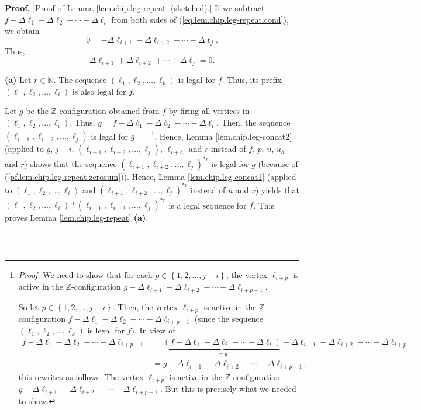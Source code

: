 \documentclass[numbers=enddot,12pt,final,onecolumn,notitlepage]{scrartcl}%
\theoremstyle{definition}
\newenvironment{proof}[1][Proof]{\noindent\textbf{#1.} }{\ \rule{0.5em}{0.5em}}
\begin{document}
\begin{proof}
[Proof of Lemma \ref{lem.chip.leg-repeat} (sketched).] If we subtract
$f-\Delta\ell_{1}-\Delta\ell_{2}-\cdots-\Delta\ell_{i}$ from both sides of
(\ref{eq.lem.chip.leg-repeat.cond}), we obtain%
\[
0=-\Delta\ell_{i+1}-\Delta\ell_{i+2}-\cdots-\Delta\ell_{j}.
\]
Thus,%
\begin{equation}
\Delta\ell_{i+1}+\Delta\ell_{i+2}+\cdots+\Delta\ell_{j}%
=0.\label{pf.lem.chip.leg-repeat.zerosum}%
\end{equation}


\textbf{(a)} Let $r\in\mathbb{N}$. The sequence $\left(  \ell_{1},\ell
_{2},\ldots,\ell_{k}\right)  $ is legal for $f$. Thus, its prefix $\left(
\ell_{1},\ell_{2},\ldots,\ell_{i}\right)  $ is also legal for $f$.

Let $g$ be the $\mathbb{Z}$-configuration obtained from $f$ by firing all
vertices in $\left(  \ell_{1},\ell_{2},\ldots,\ell_{i}\right)  $. Thus,
$g=f-\Delta\ell_{1}-\Delta\ell_{2}-\cdots-\Delta\ell_{i}$. Then, the sequence
$\left(  \ell_{i+1},\ell_{i+2},\ldots,\ell_{j}\right)  $ is legal for
$g$\ \ \ \ \footnote{\textit{Proof.} We need to show that for each
$p\in\left\{  1,2,\ldots,j-i\right\}  $, the vertex $\ell_{i+p}$ is active in
the $\mathbb{Z}$-configuration $g-\Delta\ell_{i+1}-\Delta\ell_{i+2}%
-\cdots-\Delta\ell_{i+p-1}$.
\par
So let $p\in\left\{  1,2,\ldots,j-i\right\}  $. Then, the vertex $\ell_{i+p}$
is active in the $\mathbb{Z}$-configuration $f-\Delta\ell_{1}-\Delta\ell
_{2}-\cdots-\Delta\ell_{i+p-1}$ (since the sequence $\left(  \ell_{1},\ell
_{2},\ldots,\ell_{k}\right)  $ is legal for $f$). In view of%
\begin{align*}
f-\Delta\ell_{1}-\Delta\ell_{2}-\cdots-\Delta\ell_{i+p-1}  &
=\underbrace{\left(  f-\Delta\ell_{1}-\Delta\ell_{2}-\cdots-\Delta\ell
_{i}\right)  }_{=g}-\Delta\ell_{i+1}-\Delta\ell_{i+2}-\cdots-\Delta
\ell_{i+p-1}\\
& =g-\Delta\ell_{i+1}-\Delta\ell_{i+2}-\cdots-\Delta\ell_{i+p-1},
\end{align*}
this rewrites as follows: The vertex $\ell_{i+p}$ is active in the
$\mathbb{Z}$-configuration $g-\Delta\ell_{i+1}-\Delta\ell_{i+2}-\cdots
-\Delta\ell_{i+p-1}$. But this is precisely what we needed to show.}. Hence,
Lemma \ref{lem.chip.leg-concat2} (applied to $g$, $j-i$, $\left(  \ell
_{i+1},\ell_{i+2},\ldots,\ell_{j}\right)  $, $\ell_{i+h}$ and $r$ instead of
$f$, $p$, $u$, $u_{h}$ and $r$) shows that the sequence $\left(  \ell
_{i+1},\ell_{i+2},\ldots,\ell_{j}\right)  ^{\ast r}$ is legal for $g$ (because
of (\ref{pf.lem.chip.leg-repeat.zerosum})). Hence, Lemma
\ref{lem.chip.leg-concat1} (applied to $\left(  \ell_{1},\ell_{2},\ldots
,\ell_{i}\right)  $ and $\left(  \ell_{i+1},\ell_{i+2},\ldots,\ell_{j}\right)
^{\ast r}$ instead of $u$ and $v$) yields that $\left(  \ell_{1},\ell
_{2},\ldots,\ell_{i}\right)  \ast\left(  \ell_{i+1},\ell_{i+2},\ldots,\ell
_{j}\right)  ^{\ast r}$ is a legal sequence for $f$. This proves Lemma
\ref{lem.chip.leg-repeat} \textbf{(a)}.


\end{proof}
\end{document}
